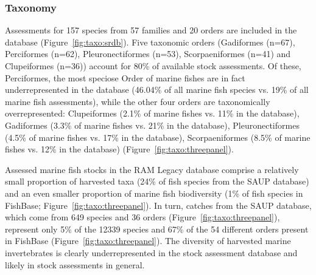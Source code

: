 
\subsubsection*{Taxonomy}

Assessments for 157 species from
57 families and 20
orders are included in the database (Figure~\ref{fig:taxo:srdb}). Five
taxonomic orders (Gadiformes (n=67),
Perciformes (n=62), Pleuronectiformes (n=53),
Scorpaeniformes (n=41) and Clupeiformes (n=36)) account for
80\% of available stock assessments.  Of these, Perciformes, the most
speciose Order of marine fishes are in fact underrepresented in the
database (46.04\% of all marine fish species vs.  19\% of all marine
fish assessments), while the other four orders are
taxonomically overrepresented: Clupeiformes (2.1\% of marine fishes
vs.  11\% in the database), Gadiformes (3.3\% of marine fishes vs.
21\% in the database), Pleuronectiformes (4.5\% of marine fishes vs.
17\% in the database), Scorpaeniformes (8.5\% of marine fishes vs.
12\% in the database) (Figure~\ref{fig:taxo:threepanel}).

Assessed marine fish stocks in the RAM Legacy database comprise a
relatively small proportion of harvested taxa
(24\% of fish species from the SAUP database)
and an even smaller proportion of marine fish biodiversity
(1\% of fish species in FishBase;
Figure~\ref{fig:taxo:threepanel}). In turn, catches from the SAUP
database, which come from 649 species and
36 orders (Figure~\ref{fig:taxo:threepanel}),
represent only 5\% of the
12339 species and 67\%
of the 54 different orders present in FishBase
(Figure~\ref{fig:taxo:threepanel}). The diversity of harvested marine
invertebrates is clearly underrepresented in the stock assessment
database and likely in stock assessments in general.




